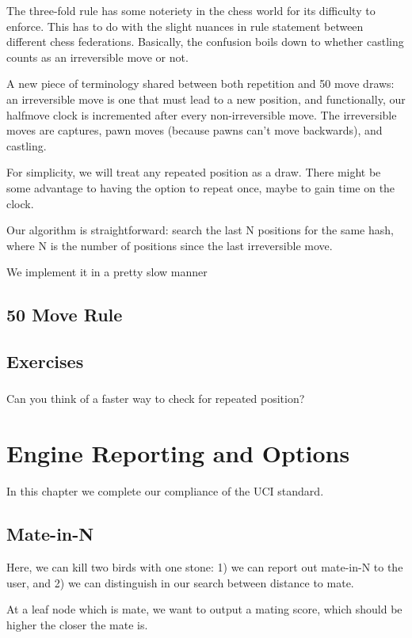 \documentclass[letterpaper,11pt]{article}
\begin{document}
The three-fold rule has some noteriety in the chess world for its difficulty to enforce. This has 
to do with the slight nuances in rule statement between different chess federations.
Basically, the confusion boils down to whether castling counts as an irreversible move or not.

A new piece of terminology shared between both repetition and 50 move draws: an irreversible move is one that must lead to a new position, and functionally,
our halfmove clock is incremented after every non-irreversible move. The irreversible moves are 
captures, pawn moves (because pawns can't move backwards), and castling.

For simplicity, we will treat any repeated position as a draw. There might be some advantage 
to having the option to repeat once, maybe to gain time on the clock.

Our algorithm is straightforward: search the last N positions for the same hash, where N is the number of positions since the last
irreversible move.

We implement it in a pretty slow manner
\subsection{50 Move Rule}
\subsection{Exercises}

\subsubsection{}
Can you think of a faster way to check for repeated position?


\section{Engine Reporting and Options}

In this chapter we complete our compliance of the UCI standard.

\subsection{Mate-in-N}

Here, we can kill two birds with one stone: 1) we can report out mate-in-N to the user, and 2) we can
distinguish in our search between distance to mate.

At a leaf node which is mate, we want to output a mating score, which should be higher
the closer the mate is.
\end{document}
